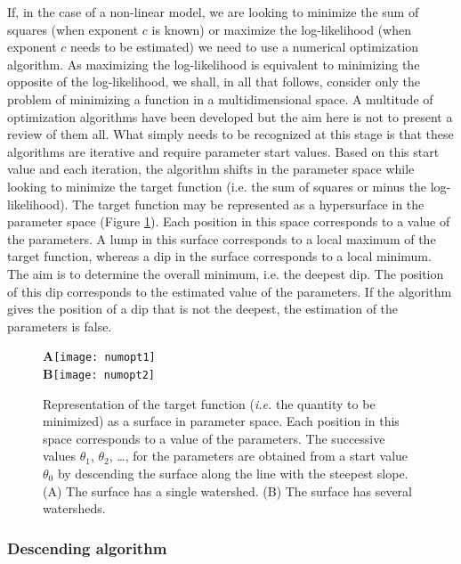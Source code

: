 If, in the case of a non-linear model, we are looking to minimize the sum of squares (when exponent $c$ is known) or maximize the log-likelihood (when exponent $c$ needs to be estimated) we need to use a numerical optimization algorithm. As maximizing the log-likelihood is equivalent to minimizing the opposite of the log-likelihood, we shall, in all that follows, consider only the problem of minimizing a function in a multidimensional space. A multitude of optimization algorithms have been developed \citep[chapitre 10]{press07} but the aim here is not to present a review of them all. What simply needs to be recognized at this stage is that these algorithms are iterative and require parameter start values. Based on this start value and each iteration, the algorithm shifts in the parameter space while looking to minimize the target function (i.e. the sum of squares or minus the log-likelihood). The target function may be represented as a hypersurface in the parameter space (Figure \ref{sp}). Each position in this space corresponds to a value of the parameters. A lump in this surface corresponds to a local maximum of the target function, whereas a dip in the surface corresponds to a local minimum. The aim is to determine the overall minimum, i.e. the deepest dip. The position of this dip corresponds to the estimated value of the parameters. If the algorithm gives the position of a dip that is not the deepest, the estimation of the parameters is false.

\begin{figure}[p]
\begin{center}
\textbf{A}\texttt{[image: numopt1]}
\\\textbf{B}\texttt{[image: numopt2]}
\end{center}
\caption[Representation of the target function]{Representation of the target function (\textit{i.e.} the quantity to be minimized) as a surface in parameter space. Each position in this space corresponds to a value of the parameters. The successive values $\theta_1$, $\theta_2$, \ldots, for the parameters are obtained from a start value $\theta_0$ by descending the surface along the line with the steepest slope.(A) The surface has a single watershed. (B) The surface has several watersheds.\label{sp}}
\end{figure}

\subsubsection{Descending algorithm}

